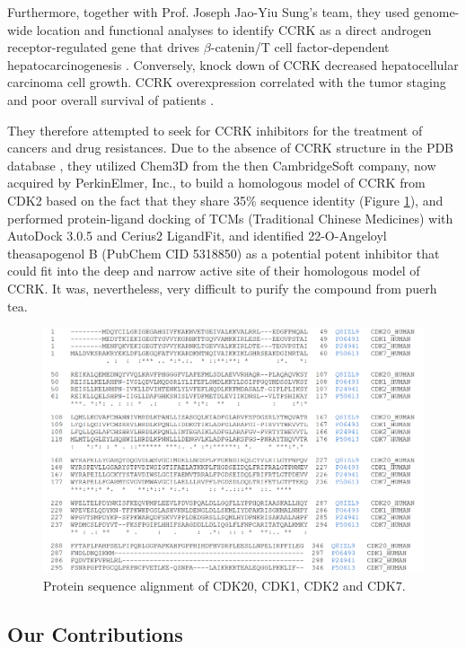 Furthermore, together with Prof. Joseph Jao-Yiu Sung's team, they used genome-wide location and functional analyses to identify CCRK as a direct androgen receptor-regulated gene that drives $\beta$-catenin/T cell factor-dependent hepatocarcinogenesis \citep{1146}. Conversely, knock down of CCRK decreased hepatocellular carcinoma cell growth. CCRK overexpression correlated with the tumor staging and poor overall survival of patients \citep{1146}.

They therefore attempted to seek for CCRK inhibitors for the treatment of cancers and drug resistances. Due to the absence of CCRK structure in the PDB database \citep{540,537}, they utilized Chem3D from the then CambridgeSoft company, now acquired by PerkinElmer, Inc., to build a homologous model of CCRK from CDK2 based on the fact that they share 35\% sequence identity (Figure \ref{Case:CDKAlignment}), and performed protein-ligand docking of TCMs (Traditional Chinese Medicines) with AutoDock 3.0.5 and Cerius2 LigandFit, and identified 22-O-Angeloyl theasapogenol B (PubChem CID 5318850) as a potential potent inhibitor that could fit into the deep and narrow active site of their homologous model of CCRK. It was, nevertheless, very difficult to purify the compound from puerh tea.

\begin{figure}
\centering
\includegraphics[width=\linewidth]{Case/CDKAlignment.png}
\caption{Protein sequence alignment of CDK20, CDK1, CDK2 and CDK7.}
\label{Case:CDKAlignment}
\end{figure}

\subsection{Our Contributions}

